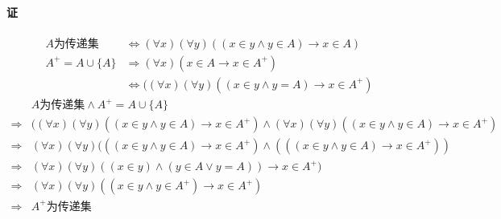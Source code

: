 \documentclass[UTF8]{ctexart}
\begin{document}
\paragraph{证}
\begin{align*}
    A\text{为传递集} 
    & \Longleftrightarrow ( \forall x) ( \forall y)((x \in y \land y \in A) \rightarrow x \in A) \\
    A^+ = A \cup \{ A \} & \Longrightarrow ( \forall x)(x \in A \rightarrow x \in A^+) \\
    & \Longleftrightarrow ( ( \forall x) ( \forall y)((x \in y \land y = A) \rightarrow x \in A^+) 
\end{align*}
\begin{align*}
    & A\text{为传递集}  \land A^+ = A \cup \{ A \} \\
    \Longrightarrow & ( ( \forall x) ( \forall y)((x \in y \land y \in A) \rightarrow x \in A^+) \land ( \forall x) ( \forall y)((x \in y \land y \in A) \rightarrow x \in A^+) \\
    \Longrightarrow & ( \forall x) ( \forall y)(((x \in y \land y \in A) \rightarrow x \in A^+) \land (((x \in y \land y \in A) \rightarrow x \in A^+)) \\
    \Longrightarrow & ( \forall x) ( \forall y)((x \in y) \land (y \in A \lor y = A)) \rightarrow x \in A^+) \\
    \Longrightarrow & ( \forall x) ( \forall y)((x \in y \land y \in A^+) \rightarrow x \in A^+) \\
    \Longrightarrow & A^+\text{为传递集}  
\end{align*}
\end{document}
